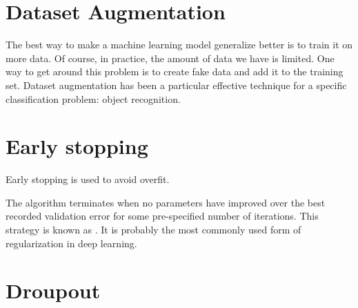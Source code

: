 \section{Dataset Augmentation}

The best way to make a machine learning model generalize better is to train it on more data.
Of course, in practice, the amount of data we have is limited.
One way to get around this problem is to create fake data and add it to the training set.
Dataset augmentation has been a particular effective technique for a specific classification problem: object recognition.



\section{Early stopping}
\label{sec:early-stopping}


Early stopping is used to avoid overfit.

The algorithm terminates when no parameters have improved over the best recorded validation error for some pre-specified number of iterations.
This strategy is known as .
It is probably the most commonly used form of regularization in deep learning.


\section{Droupout}
\label{sec:droupout}



